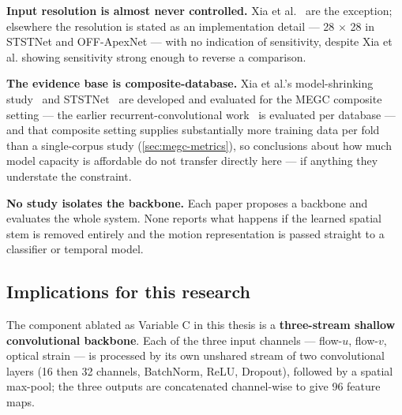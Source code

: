 \textbf{Input resolution is almost never controlled.} Xia et al.~\cite{xia2020b} are the exception; elsewhere the resolution is stated as an implementation detail --- 28 $\times$ 28 in STSTNet and OFF-ApexNet --- with no indication of sensitivity, despite Xia et al. showing sensitivity strong enough to reverse a comparison.

\textbf{The evidence base is composite-database.} Xia et al.'s model-shrinking study~\cite{xia2020b} and STSTNet~\cite{liong2019b} are developed and evaluated for the MEGC composite setting --- the earlier recurrent-convolutional work~\cite{xia2020a} is evaluated per database --- and that composite setting supplies substantially more training data per fold than a single-corpus study (\autoref{sec:megc-metrics}), so conclusions about how much model capacity is affordable do not transfer directly here --- if anything they understate the constraint.

\textbf{No study isolates the backbone.} Each paper proposes a backbone and evaluates the whole system. None reports what happens if the learned spatial stem is removed entirely and the motion representation is passed straight to a classifier or temporal model.

\subsection{Implications for this research}
\label{sec:cnn-implications}

The component ablated as Variable C in this thesis is a \textbf{three-stream shallow convolutional backbone}. Each of the three input channels --- flow-$u$, flow-$v$, optical strain --- is processed by its own unshared stream of two convolutional layers (16 then 32 channels, BatchNorm, ReLU, Dropout), followed by a spatial max-pool; the three outputs are concatenated channel-wise to give 96 feature maps.

